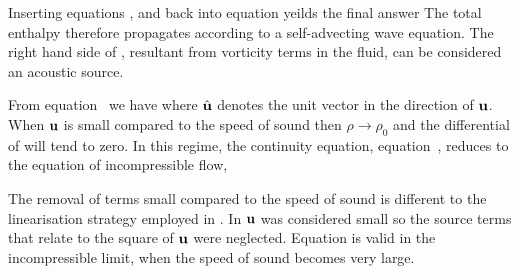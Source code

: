 Inserting equations ,  and  back into equation  yeilds the final answer 
The total enthalpy therefore propagates according to a self-advecting wave equation.
The right hand side of , resultant from vorticity terms in the fluid, can be considered an acoustic source.

From equation~ we have
where $\hat {\textbf{u}}$ denotes the unit vector in the direction of $\textbf{u}$.
When $\textbf{u}$ is small compared to the speed of sound then $\rho \rightarrow \rho_0$
and the differential of will tend to zero.
In this regime, the continuity equation, equation~, reduces to the equation of incompressible flow,

The removal of terms small compared to the speed of sound is different to the linearisation strategy employed in .
In  $\textbf{u}$ was considered small so the source terms that relate to the square of $\textbf{u}$ were neglected.
Equation  is  valid in the incompressible limit,
when the speed of sound becomes very large.
  



